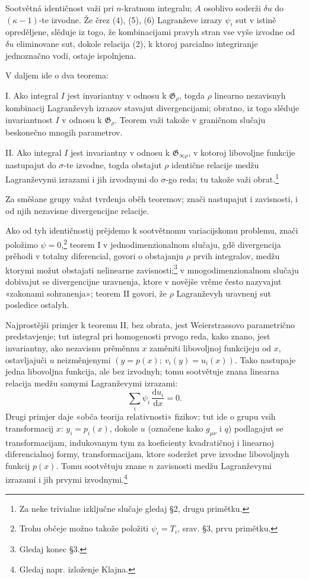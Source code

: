 \documentclass[11pt]{article}
\providecommand{\G}{\mathfrak G}
\providecommand{\dd}{\mathrm d}
\begin{document}
Sootvětná identičnost važi pri \(n\)-kratnom integralu; \(A\) osoblivo soderži \(\delta u\) do \((\kappa-1)\)-te izvodne. Že črez (4), (5), (6) Lagranževe izrazy \(\psi_i\) sut v istině opreděljene, slěduje iz togo, že kombinacijami pravyh stran vse vyše izvodne od \(\delta u\) eliminovane sut, dokole relacija (2), k ktoroj parcialno integriranje jednoznačno vodi, ostaje ispolnjena.

V daljem ide o dva teorema:

I. Ako integral \(I\) jest invariantny v odnosu k \(\G_\rho\), togda \(\rho\) linearno nezavisnyh kombinacij Lagranževyh izrazov stavajut divergencijami; obratno, iz togo slěduje invariantnost \(I\) v odnosu k \(\G_\rho\). Teorem važi takože v graničnom slučaju beskonečno mnogih parametrov.

II. Ako integral \(I\) jest invariantny v odnosu k \(\G_{\infty\rho}\), v kotoroj libovoljne funkcije nastupajut do \(\sigma\)-te izvodne, togda obstajut \(\rho\) identične relacije medžu Lagranževymi izrazami i jih izvodnymi do \(\sigma\)-go reda; tu takože važi obrat.\footnote{Za neke trivialne izključne slučaje gledaj \S{}2, drugu primětku.}

Za směšane grupy važat tvrđenja oběh teoremov; znači nastupajut i zavisnosti, i od njih nezavisne divergencijne relacije.

Ako od tyh identičnostij prějdemo k sootvětnomu variacijskomu problemu, znači položimo \(\psi=0\),\footnote{Trohu občeje možno takože položiti \(\psi_i=T_i\), srav. \S{}3, prvu primětku.} teorem I v jednodimenzionalnom slučaju, gdě divergencija prěhodi v totalny diferencial, govori o obstajanju \(\rho\) prvih integralov, medžu ktorymi možut obstajati nelinearne zavisnosti;\footnote{Gledaj konec \S{}3.} v mnogodimenzionalnom slučaju dobivajut se divergencijne uravnenja, ktore v novějše vrěme često nazyvajut «zakonami sohranenja»; teorem II govori, že \(\rho\) Lagranževyh uravnenj sut posledice ostalyh.

Najprostějši primjer k teoremu II, bez obrata, jest Weierstrassovo parametrično predstavjenje; tut integral pri homogenosti prvogo reda, kako znano, jest invariantny, ako nezavisnu prěměnnu \(x\) zaměniti libovoljnoj funkcijeju od \(x\), ostavljajuči \(u\) neizměnjenymi \((y=p(x);\ v_i(y)=u_i(x))\). Tako nastupaje jedna libovoljna funkcija, ale bez izvodnyh; tomu sootvětuje znana linearna relacija medžu samymi Lagranževymi izrazami:
\[
\sum_i \psi_i\,\frac{\dd u_i}{\dd x}=0.
\]
Drugi primjer daje «obča teorija relativnosti» fizikov; tut ide o grupu vsih transformacij \(x\): \(y_i=p_i(x)\), dokole \(u\) (označene kako \(g_{\mu\nu}\) i \(q\)) podlagajut se transformacijam, indukovanym tym za koeficienty kvadratičnoj i linearnoj diferencialnoj formy, transformacijam, ktore soderžet prve izvodne libovoljnyh funkcij \(p(x)\). Tomu sootvětuju znane \(n\) zavisnosti medžu Lagranževymi izrazami i jih prvymi izvodnymi.\footnote{Gledaj napr. izloženje Klajna.}
\end{document}
